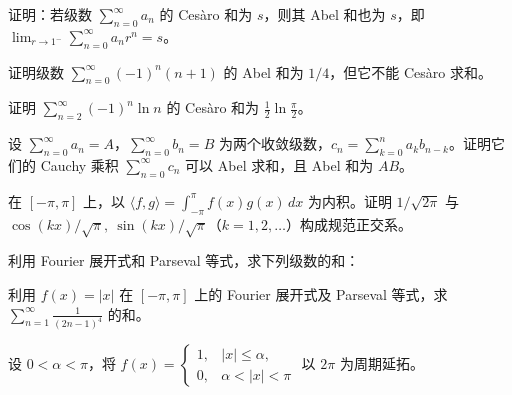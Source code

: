 \noindent\begin{minipage}{\textwidth}
证明：若级数 $\displaystyle\sum_{n=0}^\infty a_n$ 的 Cesàro 和为 $s$，则其 Abel 和也为 $s$，即 $\displaystyle\lim_{r\to1^-}\sum_{n=0}^\infty a_n r^n=s$。
\end{minipage}\par\vfill
\newpage
\noindent\begin{minipage}{\textwidth}
证明级数 $\displaystyle\sum_{n=0}^\infty(-1)^n(n+1)$ 的 Abel 和为 $1/4$，但它不能 Cesàro 求和。
\end{minipage}\par\vfill
\noindent\begin{minipage}{\textwidth}
证明 $\displaystyle\sum_{n=2}^\infty(-1)^n\ln n$ 的 Cesàro 和为 $\displaystyle\frac12\ln\frac\pi2$。
\end{minipage}\par\vfill
\noindent\begin{minipage}{\textwidth}
设 $\displaystyle\sum_{n=0}^\infty a_n=A$，$\displaystyle\sum_{n=0}^\infty b_n=B$ 为两个收敛级数，$\displaystyle c_n=\sum_{k=0}^n a_kb_{n-k}$。证明它们的 Cauchy 乘积 $\sum_{n=0}^\infty c_n$ 可以 Abel 求和，且 Abel 和为 $AB$。
\end{minipage}\par\vfill
\newpage
\noindent\begin{minipage}{\textwidth}
在 $[-\pi,\pi]$ 上，以 $\langle f,g\rangle=\int_{-\pi}^{\pi}f(x)g(x)\,dx$ 为内积。证明 $1/\sqrt{2\pi}$ 与 $\cos(kx)/\sqrt\pi,\ \sin(kx)/\sqrt\pi$（$k=1,2,\ldots$）构成规范正交系。
\end{minipage}\par\vfill
\noindent\begin{minipage}{\textwidth}
利用 Fourier 展开式和 Parseval 等式，求下列级数的和：
\end{minipage}\par\vfill
\noindent\begin{minipage}{\textwidth}
利用 $f(x)=|x|$ 在 $[-\pi,\pi]$ 上的 Fourier 展开式及 Parseval 等式，求 $\displaystyle\sum_{n=1}^\infty\frac1{(2n-1)^4}$ 的和。
\end{minipage}\par\vfill
\newpage
\noindent\begin{minipage}{\textwidth}
设 $0<\alpha<\pi$，将 $\displaystyle f(x)=\begin{cases}1,&|x|\le\alpha,\\0,&\alpha<|x|<\pi\end{cases}$ 以 $2\pi$ 为周期延拓。
\end{minipage}\par\vfill
